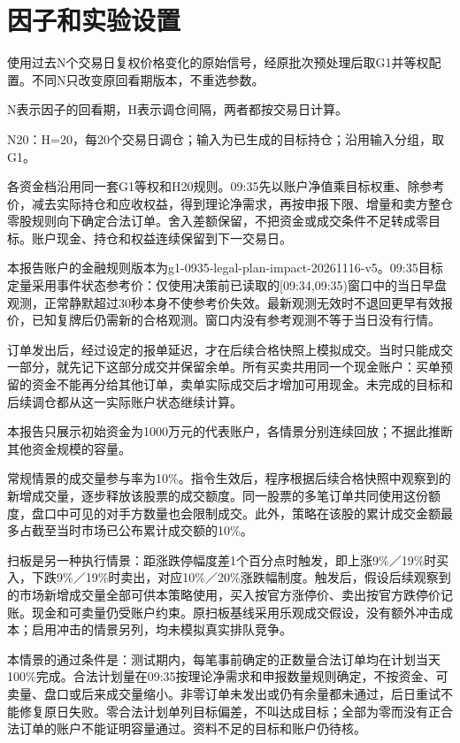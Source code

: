 \documentclass[UTF8,10pt,a4paper,fontset=fandol]{ctexart}
\begin{document}
\section*{因子和实验设置}
使用过去N个交易日复权价格变化的原始信号，经原批次预处理后取G1并等权配置。不同N只改变原回看期版本，不重选参数。

N表示因子的回看期，H表示调仓间隔，两者都按交易日计算。

N20：H=20，每20个交易日调仓；输入为已生成的目标持仓；沿用输入分组，取G1。

各资金档沿用同一套G1等权和H20规则。09:35先以账户净值乘目标权重、除参考价，减去实际持仓和应收权益，得到理论净需求，再按申报下限、增量和卖方整仓零股规则向下确定合法订单。舍入差额保留，不把资金或成交条件不足转成零目标。账户现金、持仓和权益连续保留到下一交易日。

本报告账户的金融规则版本为g1-0935-legal-plan-impact-20261116-v5。09:35目标定量采用事件状态参考价：仅使用决策前已读取的[09:34,09:35)窗口中的当日早盘观测，正常静默超过30秒本身不使参考价失效。最新观测无效时不退回更早有效报价，已知复牌后仍需新的合格观测。窗口内没有参考观测不等于当日没有行情。

订单发出后，经过设定的报单延迟，才在后续合格快照上模拟成交。当时只能成交一部分，就先记下这部分成交并保留余单。所有买卖共用同一个现金账户：买单预留的资金不能再分给其他订单，卖单实际成交后才增加可用现金。未完成的目标和后续调仓都从这一实际账户状态继续计算。

本报告只展示初始资金为1000万元的代表账户，各情景分别连续回放；不据此推断其他资金规模的容量。

常规情景的成交量参与率为10\%。指令生效后，程序根据后续合格快照中观察到的新增成交量，逐步释放该股票的成交额度。同一股票的多笔订单共同使用这份额度，盘口中可见的对手方数量也会限制成交。此外，策略在该股的累计成交金额最多占截至当时市场已公布累计成交额的10\%。

扫板是另一种执行情景：距涨跌停幅度差1个百分点时触发，即上涨9\%／19\%时买入，下跌9\%／19\%时卖出，对应10\%／20\%涨跌幅制度。触发后，假设后续观察到的市场新增成交量全部可供本策略使用，买入按官方涨停价、卖出按官方跌停价记账。现金和可卖量仍受账户约束。原扫板基线采用乐观成交假设，没有额外冲击成本；启用冲击的情景另列，均未模拟真实排队竞争。

本情景的通过条件是：测试期内，每笔事前确定的正数量合法订单均在计划当天100\%完成。合法计划量在09:35按理论净需求和申报数量规则确定，不按资金、可卖量、盘口或后来成交量缩小。非零订单未发出或仍有余量都未通过，后日重试不能修复原日失败。零合法计划单列目标偏差，不叫达成目标；全部为零而没有正合法订单的账户不能证明容量通过。资料不足的目标和账户仍待核。
\end{document}
